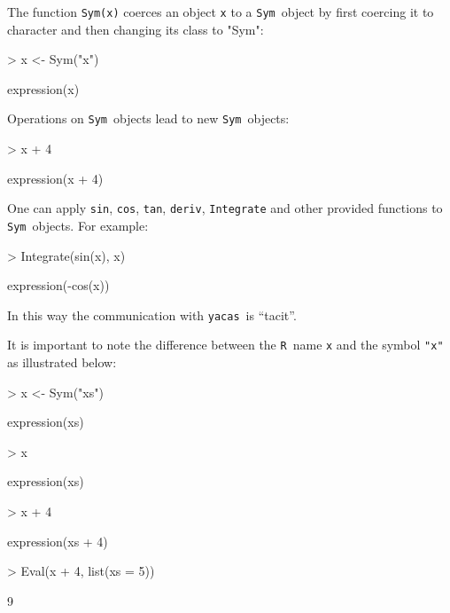 \documentclass[]{article}
\newcommand{\yacas}{{\tt yacas}}
\newcommand{\code}[1]{{\tt #1}}
\def\R{\texttt{R}}
\def\sym{\texttt{Sym}}
\begin{document}
The function \code{Sym(x)} coerces an object \code{x} to a \sym\ object by
first coercing it to character and then changing its class to "Sym":
\begin{Schunk}
\begin{Sinput}
> x <- Sym("x")
\end{Sinput}
\begin{Soutput}
expression(x)
\end{Soutput}
\end{Schunk}

Operations on \sym\ objects lead to new \sym\ objects:
\begin{Schunk}
\begin{Sinput}
> x + 4
\end{Sinput}
\begin{Soutput}
expression(x + 4)
\end{Soutput}
\end{Schunk}

One can apply \code{sin}, \code{cos}, \code{tan}, \code{deriv}, \code{Integrate}
and other provided functions to \sym\ objects. For example:
\begin{Schunk}
\begin{Sinput}
> Integrate(sin(x), x)
\end{Sinput}
\begin{Soutput}
expression(-cos(x))
\end{Soutput}
\end{Schunk}
In this way the communication with \yacas\ is ``tacit''.

It is important to note the difference between the \R\ name \code{x}
and the symbol \code{"x"} as illustrated below:
\begin{Schunk}
\begin{Sinput}
> x <- Sym("xs")
\end{Sinput}
\begin{Soutput}
expression(xs)
\end{Soutput}
\begin{Sinput}
> x
\end{Sinput}
\begin{Soutput}
expression(xs)
\end{Soutput}
\begin{Sinput}
> x + 4
\end{Sinput}
\begin{Soutput}
expression(xs + 4)
\end{Soutput}
\begin{Sinput}
> Eval(x + 4, list(xs = 5))
\end{Sinput}
\begin{Soutput}
[1] 9
\end{Soutput}
\end{Schunk}
\end{document}
